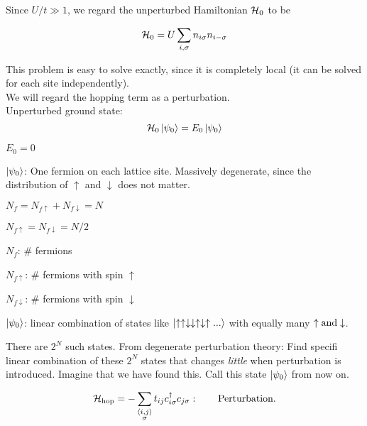 Since $U/t \gg 1$, we regard the unperturbed Hamiltonian $\mathcal{H}_0$ to be

\begin{equation}
    \mathcal{H}_0 = U\sum_{i, \sigma} n_{i \sigma} n_{i -\sigma}
\end{equation}

 This problem is easy to solve exactly, since it is completely local (it can be solved for each site independently).\\

 We will regard the hopping term as a perturbation. \\

Unperturbed ground state:
\begin{equation}
    \mathcal{H}_0 \ket{\psi_0} = E_0 \ket{\psi_0}
\end{equation}

\begin{description}
    \item $E_0 = 0$
    \item $\ket{\psi_0}$: One fermion on each lattice site. Massively degenerate, since the distribution of $\uparrow$ and $\downarrow$ does not matter.

    \item $N_f = N_{f \uparrow} + N_{f \downarrow} = N $
    \item $N_{f \uparrow} = N_{f \downarrow} = N/2$
    
    \item $N_f$: \# fermions
    \item $N_{f\uparrow}$: \# fermions with spin $\uparrow$
    \item $N_{f\downarrow}$: \# fermions with spin $\downarrow$

    \item $\ket{\psi_0}$: linear combination of states like $\ket{\uparrow\uparrow\downarrow\downarrow\uparrow\downarrow
    \uparrow...}$ with equally many $\uparrow \rm{and} \downarrow$.
\end{description}

There are $2^N$ such states. From degenerate perturbation theory: Find specifi linear combination of these $2^N$ states that changes \emph{little} when perturbation is introduced. Imagine that we have found this. Call this state $\ket{\psi_0}$ from now on.

\begin{equation}
    \mathcal{H}_{\text{hop}} = - \sum_{\substack{\langle i, j \rangle \\ \sigma}} t_{ij} c_{i\sigma}^\dagger c_{j\sigma}: \qquad \text{Perturbation.}
\end{equation}


